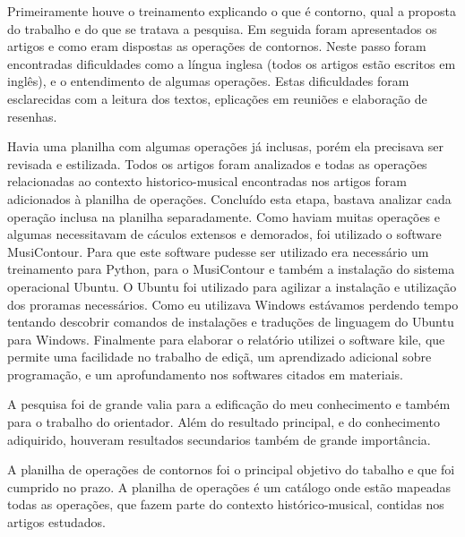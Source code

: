 \documentclass[11pt]{article}
\begin{document}
Primeiramente houve o treinamento explicando o que é contorno, qual a proposta do trabalho e
do que se tratava a pesquisa. Em seguida foram apresentados os artigos e como eram dispostas
as operações de contornos. Neste passo foram encontradas dificuldades como a língua inglesa (todos
os artigos estão escritos em inglês), e o entendimento de algumas operações. Estas dificuldades
foram esclarecidas com a leitura dos textos, eplicações em reuniões e elaboração de resenhas.

Havia uma planilha com algumas operações já inclusas, porém ela precisava ser revisada e estilizada.
Todos os artigos foram analizados e todas as operações relacionadas ao contexto historico-musical
encontradas nos artigos foram adicionados à planilha de operações. Concluído esta etapa, bastava analizar
cada operação inclusa na planilha separadamente. Como haviam muitas operações e algumas necessitavam de
cáculos extensos e demorados, foi utilizado o software MusiContour. Para que este software pudesse ser
utilizado era necessário um treinamento para Python, para o MusiContour e também a instalação do 
sistema operacional Ubuntu. O Ubuntu foi utilizado para agilizar a instalação e utilização dos proramas
necessários. Como eu utilizava Windows estávamos perdendo tempo tentando descobrir comandos de instalações
e traduções de linguagem do Ubuntu para Windows. 
Finalmente para elaborar o relatório utilizei o software kile, que permite uma facilidade no trabalho
de ediçã, um aprendizado adicional sobre programação, e um aprofundamento nos softwares citados em materiais.




\label{sec:resultados}


A pesquisa foi de grande valia para a edificação do meu conhecimento e também para o trabalho do orientador.
Além do resultado principal, e do conhecimento adiquirido, houveram resultados secundarios também de grande
importância.

A planilha de operações de contornos foi o principal objetivo do tabalho e que foi cumprido no prazo. A planilha 
de operações é um catálogo onde estão mapeadas todas as operações, que fazem parte do contexto histórico-musical,
contidas nos artigos estudados.
\end{document}
